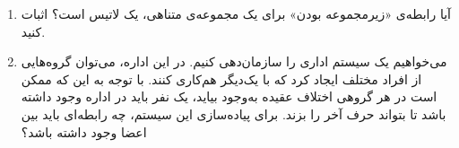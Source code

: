 \EXERCISE
\begin{enumerate}
\item
آیا رابطه‌ی «زیرمجموعه بودن» برای یک مجموعه‌ی متناهی، یک لاتیس است؟ اثبات کنید.
\item
می‌خواهیم یک سیستم اداری را سازمان‌دهی کنیم. در این اداره، می‌توان گروه‌هایی از افراد مختلف ایجاد کرد که با یک‌دیگر هم‌کاری کنند. با توجه به این که ممکن است در هر گروهی اختلاف عقیده به‌وجود بیاید، یک نفر باید در اداره وجود داشته باشد تا بتواند حرف آخر را بزند. برای پیاده‌سازی این سیستم، چه رابطه‌ای باید بین اعضا وجود داشته باشد؟
\end{enumerate}